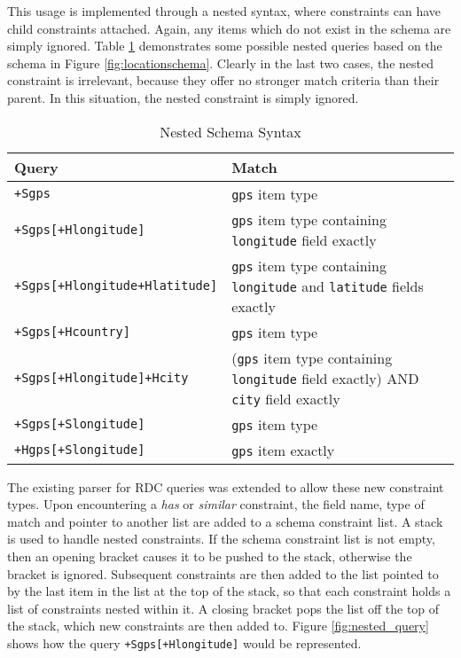 \documentclass[12pt,twoside,notitlepage]{report}
\begin{document}
This usage is implemented through a nested syntax, where constraints can have child constraints attached. 
Again, any items which do not exist in the schema are simply ignored. 
Table \ref{tab:nested_schema_syntax} demonstrates some possible nested queries based on the schema in Figure \ref{fig:locationschema}. 
Clearly in the last two cases, the nested constraint is irrelevant, because they offer no stronger match criteria than their parent. 
In this situation, the nested constraint is simply ignored.

\begin{table}[tbh]
\centering

\begin{tabular}{l p{8cm}}
\hline\hline
Query & Match \\
\hline

{\tt +Sgps}							& {\tt gps} item type \\
{\tt +Sgps[+Hlongitude]}			& {\tt gps} item type containing {\tt longitude} field exactly \\
{\tt +Sgps[+Hlongitude+Hlatitude]}	& {\tt gps} item type containing {\tt longitude} and {\tt latitude} fields exactly \\

{\tt +Sgps[+Hcountry]}				& {\tt gps} item type \\

{\tt +Sgps[+Hlongitude]+Hcity}		& ({\tt gps} item type containing {\tt longitude} field exactly) AND {\tt city} field exactly \\

{\tt +Sgps[+Slongitude]}			& {\tt gps} item type \\
{\tt +Hgps[+Slongitude]}			& {\tt gps} item exactly \\

\hline
\end{tabular}

\caption{Nested Schema Syntax}
\label{tab:nested_schema_syntax}
\end{table}

The existing parser for RDC queries was extended to allow these new constraint types. 
Upon encountering a {\sl has} or {\sl similar} constraint, the field name, type of match and pointer to another list are added to a schema constraint list. 
A stack is used to handle nested constraints. 
If the schema constraint list is not empty, then an opening bracket causes it to be pushed to the stack, otherwise the bracket is ignored. 
Subsequent constraints are then added to the list pointed to by the last item in the list at the top of the stack, so that each constraint holds a list of constraints nested within it. 
A closing bracket pops the list off the top of the stack, which new constraints are then added to. 
Figure \ref{fig:nested_query} shows how the query {\tt +Sgps[+Hlongitude]} would be represented.  
\end{document}

